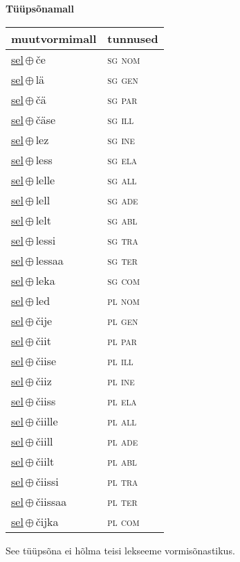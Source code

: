 

\vspace{3.5em}
\noindent \begin{minipage}{\textwidth}
\noindent \textbf{Tüüpsõnamall \,}\\

\begin{sideways}
\begin{tabular}{l l}
muutvormimall & tunnused \\
\hline
\underline{sel}\,$\oplus$\,če & \textsc{ sg nom } \\
\underline{sel}\,$\oplus$\,lä & \textsc{ sg gen } \\
\underline{sel}\,$\oplus$\,čä & \textsc{ sg par } \\
\underline{sel}\,$\oplus$\,čäse & \textsc{ sg ill } \\
\underline{sel}\,$\oplus$\,lez & \textsc{ sg ine } \\
\underline{sel}\,$\oplus$\,less & \textsc{ sg ela } \\
\underline{sel}\,$\oplus$\,lelle & \textsc{ sg all } \\
\underline{sel}\,$\oplus$\,lell & \textsc{ sg ade } \\
\underline{sel}\,$\oplus$\,lelt & \textsc{ sg abl } \\
\underline{sel}\,$\oplus$\,lessi & \textsc{ sg tra } \\
\underline{sel}\,$\oplus$\,lessaa & \textsc{ sg ter } \\
\underline{sel}\,$\oplus$\,leka & \textsc{ sg com } \\
\underline{sel}\,$\oplus$\,led & \textsc{ pl nom } \\
\underline{sel}\,$\oplus$\,čije & \textsc{ pl gen } \\
\underline{sel}\,$\oplus$\,čiit & \textsc{ pl par } \\
\underline{sel}\,$\oplus$\,čiise & \textsc{ pl ill } \\
\underline{sel}\,$\oplus$\,čiiz & \textsc{ pl ine } \\
\underline{sel}\,$\oplus$\,čiiss & \textsc{ pl ela } \\
\underline{sel}\,$\oplus$\,čiille & \textsc{ pl all } \\
\underline{sel}\,$\oplus$\,čiill & \textsc{ pl ade } \\
\underline{sel}\,$\oplus$\,čiilt & \textsc{ pl abl } \\
\underline{sel}\,$\oplus$\,čiissi & \textsc{ pl tra } \\
\underline{sel}\,$\oplus$\,čiissaa & \textsc{ pl ter } \\
\underline{sel}\,$\oplus$\,čijka & \textsc{ pl com } \\
\end{tabular}
\end{sideways}
\label{tab:tüüpsõnamall-selče}

\end{minipage}

 
\vspace{1em}
\noindent See tüüpsõna ei hõlma teisi lekseeme vormi\-sõnastikus.
